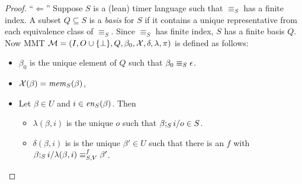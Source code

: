 \begin{proof}
``$\Leftarrow$'' 
Suppose $S$ is a (lean) timer language such that $\equiv_S$ has a finite index.
A subset $Q \subseteq S$ is a \emph{basis} for $S$ if it contains a unique representative from
each equivalence class of $\equiv_S$.
%
Since $\equiv_S$ has finite index, $S$ has a finite basis $Q$.
Now MMT ${\mathcal M} = (I, O \cup \{ \perp \}, Q, \beta_0, \mathcal{X}, \delta, \lambda, \pi)$ is defined as follows:
\begin{itemize}
\item
$\beta_0$ is the unique element of $Q$ such that $\beta_0 \equiv_S \epsilon$.
\item
$\mathcal{X}(\beta) = \mathit{mem}_{S}(\beta)$,
\item Let $\beta \in U$ and $i \in \mathit{en}_{S}(\beta)$. Then
  \begin{itemize}
    \item $\lambda(\beta,i)$ is
     the unique $o$ such that $\beta;_Si/o \in S$. 
    \item $\delta(\beta,i)$ is is
        the unique $\beta' \in U$ such that there is an $f$ with
  $\beta;_Si/\lambda(\beta,i) \equiv_{S,V}^f \beta'$.

\end{itemize}
\end{itemize}
\end{proof}
